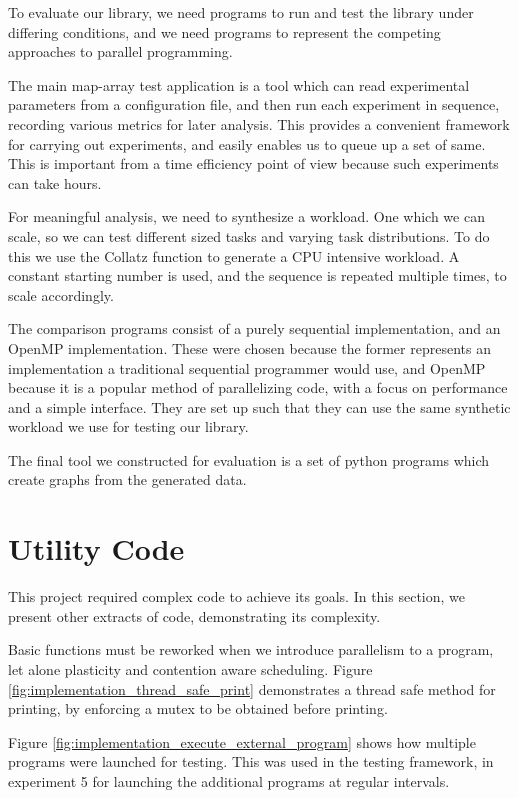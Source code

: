 To evaluate our library, we need programs to run and test the library under differing conditions, and we need programs to represent the competing approaches to parallel programming. 

The main map-array test application is a tool which can read experimental parameters from a configuration file, and then run each experiment in sequence, recording various metrics for later analysis. This provides a convenient framework for carrying out experiments, and easily enables us to queue up a set of same. This is important from a time efficiency point of view because such experiments can take hours.

For meaningful analysis, we need to synthesize a workload. One which we can scale, so we can test different sized tasks and varying task distributions. To do this we use the Collatz function to generate a CPU intensive workload. A constant starting number is used, and the sequence is repeated multiple times, to scale accordingly.

The comparison programs consist of a purely sequential implementation, and an OpenMP implementation. These were chosen because the former represents an implementation a traditional sequential programmer would use, and OpenMP because it is a popular method of parallelizing code, with a focus on performance and a simple interface. They are set up such that they can use the same synthetic workload we use for testing our library.

The final tool we constructed for evaluation is a set of python programs which create graphs from the generated data.



\section{Utility Code}

This project required complex code to achieve its goals. In this section, we present other extracts of code, demonstrating its complexity. 

Basic functions must be reworked when we introduce parallelism to a program, let alone plasticity and contention aware scheduling. Figure \ref{fig:implementation_thread_safe_print} demonstrates a thread safe method for printing, by enforcing a mutex to be obtained before printing.

Figure \ref{fig:implementation_execute_external_program} shows how multiple programs were launched for testing. This was used in the testing framework, in experiment 5 for launching the additional programs at regular intervals.

